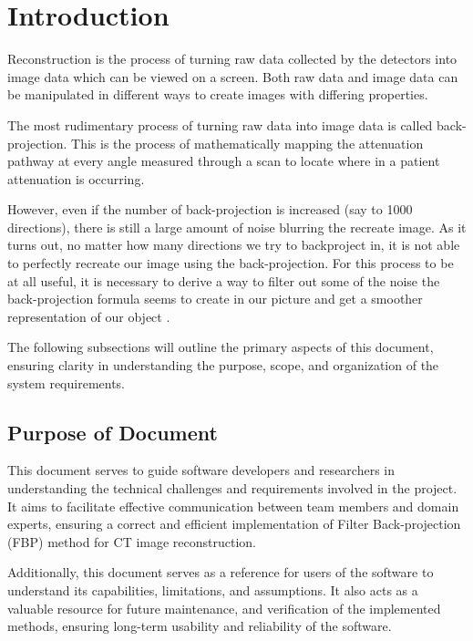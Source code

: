 \documentclass[12pt]{article}
\begin{document}
\newpage

\section{Introduction} \label{introduction}
Reconstruction is the process of turning raw data collected by the detectors
into image data which can be viewed on a screen. Both raw data and image data
can be manipulated in different ways to create images with differing properties.

The most rudimentary process of turning raw data into image data is called
back-projection. This is the process of mathematically mapping the attenuation
pathway at every angle measured through a scan to locate where in a patient
attenuation is occurring.

However, even if the number of back-projection is increased (say to 1000 directions),
there is still a large amount of noise blurring the recreate image. As it turns
out, no matter how many directions we try to backproject in, it is not able to
perfectly recreate our image using the back-projection. For this process to be at
all useful, it is necessary to derive a way to filter out some of the noise the
back-projection formula seems to create in our picture and get a smoother
representation of our object \cite{Beatty2012}.

The following subsections will outline the primary aspects of this document,
ensuring clarity in understanding the purpose, scope, and organization of the
system requirements.

\subsection{Purpose of Document}
This document serves to guide software developers and researchers in
understanding the technical challenges and requirements involved in the project.
It aims to facilitate effective communication between team members and domain
experts, ensuring a correct and efficient implementation of Filter
Back-projection (FBP) method for CT image reconstruction.

Additionally, this document serves as a reference for users of the software to
understand its capabilities, limitations, and assumptions. It also acts as a
valuable resource for future maintenance, and verification of the implemented
methods, ensuring long-term usability and reliability of the software.
\end{document}

